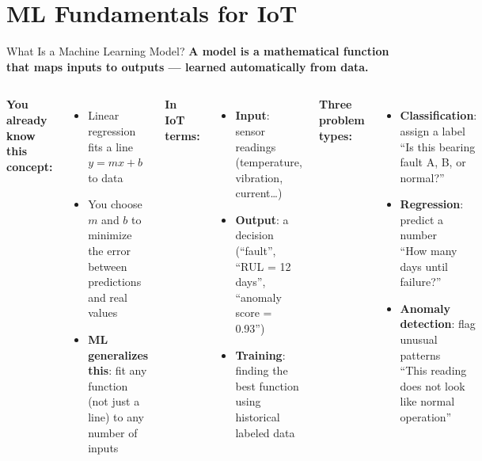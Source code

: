 \documentclass[aspectratio=169,11pt]{beamer}
\begin{document}
\section{ML Fundamentals for IoT}

\begin{frame}{What Is a Machine Learning Model?}
    \scriptsize
    \textbf{A model is a mathematical function that maps inputs to outputs --- learned automatically from data.}

    \vspace{0.03cm}
    \begin{columns}
        \textbf{You already know this concept:}
        \begin{itemize}\setlength{\itemsep}{0pt}
            \item Linear regression fits a line $y = mx + b$ to data
            \item You choose $m$ and $b$ to minimize the error between predictions and real values
            \item \textbf{ML generalizes this}: fit any function (not just a line) to any number of inputs
        \end{itemize}

        \vspace{0.03cm}
        \textbf{In IoT terms:}
        \begin{itemize}\setlength{\itemsep}{0pt}
            \item \textbf{Input}: sensor readings (temperature, vibration, current\ldots)
            \item \textbf{Output}: a decision (``fault'', ``RUL = 12 days'', ``anomaly score = 0.93'')
            \item \textbf{Training}: finding the best function using historical labeled data
        \end{itemize}

        \textbf{Three problem types:}
        \begin{itemize}\setlength{\itemsep}{0pt}
            \item \textbf{Classification}: assign a label\\{``Is this bearing fault A, B, or normal?''}
            \item \textbf{Regression}: predict a number\\{``How many days until failure?''}
            \item \textbf{Anomaly detection}: flag unusual patterns\\{``This reading does not look like normal operation''}
        \end{itemize}


\end{columns}
\end{frame}
\end{document}

